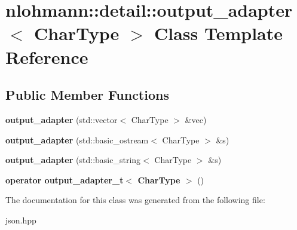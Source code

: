\hypertarget{classnlohmann_1_1detail_1_1output__adapter}{}\section{nlohmann\+:\+:detail\+:\+:output\+\_\+adapter$<$ Char\+Type $>$ Class Template Reference}
\label{classnlohmann_1_1detail_1_1output__adapter}
\subsection*{Public Member Functions}
\begin{DoxyCompactItemize}
\item 
\mbox{\label{classnlohmann_1_1detail_1_1output__adapter_a117bda35bc3de85fd2f5f2153d9705b4}} 
{\bfseries output\+\_\+adapter} (std\+::vector$<$ Char\+Type $>$ \&vec)
\item 
\mbox{\label{classnlohmann_1_1detail_1_1output__adapter_ac086bc101f246eb815e46f17a9e68a4a}} 
{\bfseries output\+\_\+adapter} (std\+::basic\+\_\+ostream$<$ Char\+Type $>$ \&s)
\item 
\mbox{\label{classnlohmann_1_1detail_1_1output__adapter_a07f996a817ffb420022cea56425f7d5c}} 
{\bfseries output\+\_\+adapter} (std\+::basic\+\_\+string$<$ Char\+Type $>$ \&s)
\item 
\mbox{\label{classnlohmann_1_1detail_1_1output__adapter_adee7a0e124f483d9945b8b85c73d7957}} 
{\bfseries operator output\+\_\+adapter\+\_\+t$<$ Char\+Type $>$} ()
\end{DoxyCompactItemize}


The documentation for this class was generated from the following file\+:\begin{DoxyCompactItemize}
\item 
json.\+hpp\end{DoxyCompactItemize}

